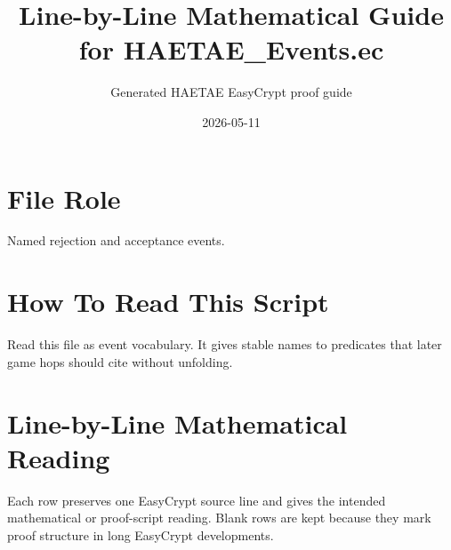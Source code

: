 \documentclass[10pt]{article}
\title{Line-by-Line Mathematical Guide for HAETAE\_Events.ec}
\author{Generated HAETAE EasyCrypt proof guide}
\date{2026-05-11}
\begin{document}
\maketitle

\section*{File Role}
Named rejection and acceptance events.

\section*{How To Read This Script}
Read this file as event vocabulary.  It gives stable names to predicates that later game hops should cite without unfolding.

\section*{Line-by-Line Mathematical Reading}
Each row preserves one EasyCrypt source line and gives the intended mathematical
or proof-script reading.  Blank rows are kept because they mark proof structure
in long EasyCrypt developments.
\end{document}
